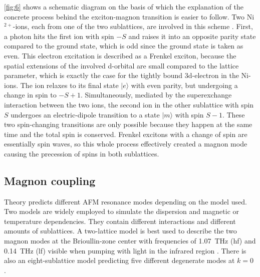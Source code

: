 \FloatBarrier
\autoref{fig:6} shows a schematic diagram on the basis of which the explanation of the concrete process behind the exciton-magnon transition is easier to follow.
Two Ni$^{2+}$-ions, each from one of the two sublattices, are involved in this scheme .
First, a photon hits the first ion with spin $-S$ and raises it into an opposite parity state compared to the ground state, which is odd since the ground state is taken as even.
This electron excitation is described as a Frenkel exciton, because the spatial extensions of the involved d-orbital are small compared to the lattice parameter, which is exactly the case for the tightly bound 3d-electron in the Ni-ions.
The ion relaxes to its final state $|e\rangle$ with even parity, but undergoing a change in spin to $-S+1$.
Simultaneously, mediated by the superexchange interaction between the two ions, the second ion in the other sublattice with spin $S$ undergoes an electric-dipole transition to a state $|m\rangle$ with spin $S-1$.
These two spin-changing transitions are only possible because they happen at the same time and the total spin is conserved.
Frenkel excitons with a change of spin are essentially spin waves, so this whole process effectively created a magnon mode causing the precession of spins in both sublattices.

\subsection{Magnon coupling}
\label{sec:mode_coupling}
Theory predicts different AFM resonance modes depending on the model used.
Two models are widely employed to simulate the dispersion and magnetic or temperature dependencies.
They contain different interactions and different amounts of sublattices.
A two-lattice model is best used to describe the two magnon modes at the Brioullin-zone center with frequencies of \qty{1.07}{THz} (hf) and \qty{0.14}{THz} (lf)  visible when pumping with light in the infrared region .
There is also an eight-sublattice model predicting five different degenerate modes at $k=0$ .

